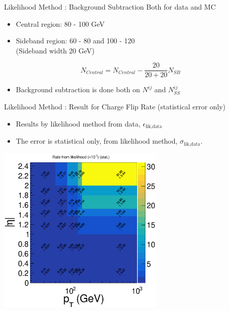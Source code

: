 \documentclass[mathserif,serif]{beamer}
\begin{document}
\begin{frame}{Likelihood Method : Background Subtraction}
Both for data and MC
\begin{itemize}
\item Central region: 80 - 100 GeV
\item Sideband region: 60 - 80 and 100 - 120 \\
(Sideband width 20 GeV)
\end{itemize}
\begin{equation*}
N_{Central} = N_{Central} - \frac{20}{20+20} N_{SB}
\end{equation*}
\begin{itemize}
\item Background subtraction is done both on $N^{ij}$ and $N^{ij}_{SS}$
\end{itemize}
\end{frame}

\begin{frame}{Likelihood Method : Result for Charge Flip Rate (statistical error only)}
\begin{itemize}
\item Results by likelihood method from data, $\epsilon_{\text{lik,data}}$
\item The error is statistical only, from likelihood method, $\sigma_{\text{lik,data}}$.
\end{itemize}
\includegraphics[width=0.6\textwidth]{data/plot/charge_flip/FitPlots/data_cf_rate_stat.eps}
\end{frame}
\end{document}
